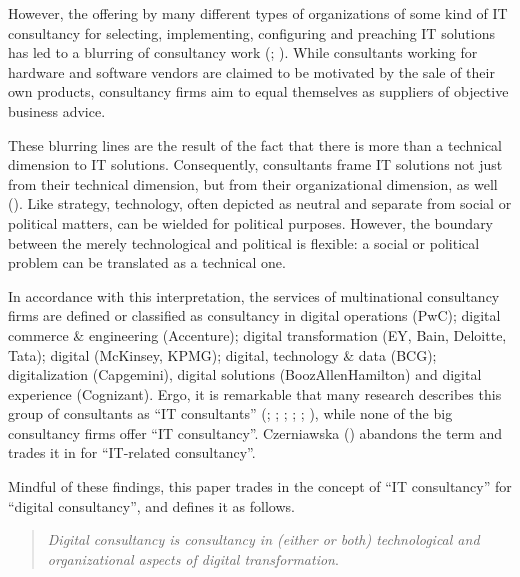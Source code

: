 \documentclass[
  man,floatsintext]{apa6}
\begin{document}
However, the offering by many different types of organizations of some kind of IT consultancy for selecting, implementing, configuring and preaching IT solutions has led to a blurring of consultancy work (; ). While consultants working for hardware and software vendors are claimed to be motivated by the sale of their own products, consultancy firms aim to equal themselves as suppliers of objective business advice.

These blurring lines are the result of the fact that there is more than a technical dimension to IT solutions. Consequently, consultants frame IT solutions not just from their technical dimension, but from their organizational dimension, as well (). Like strategy, technology, often depicted as neutral and separate from social or political matters, can be wielded for political purposes. However, the boundary between the merely technological and political is flexible: a social or political problem can be translated as a technical one.

In accordance with this interpretation, the services of multinational consultancy firms are defined or classified as consultancy in digital operations (PwC); digital commerce \& engineering (Accenture); digital transformation (EY, Bain, Deloitte, Tata); digital (McKinsey, KPMG); digital, technology \& data (BCG); digitalization (Capgemini), digital solutions (BoozAllenHamilton) and digital experience (Cognizant). Ergo, it is remarkable that many research describes this group of consultants as ``IT consultants'' (; ; ; ; ; ), while none of the big consultancy firms offer ``IT consultancy''. Czerniawska () abandons the term and trades it in for ``IT-related consultancy''.

Mindful of these findings, this paper trades in the concept of ``IT consultancy'' for ``digital consultancy'', and defines it as follows.

\begin{quote}
\emph{Digital consultancy is consultancy in (either or both) technological and organizational aspects of digital transformation}.
\end{quote}
\end{document}
